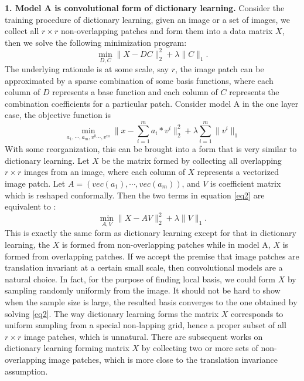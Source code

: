 \documentclass[a4paper]{article}
\begin{document}
{\textbf{1. Model A is convolutional form of dictionary learning.} Consider the training procedure of dictionary learning, given an image or a set of images, we collect all $r\times r$ non-overlapping patches and form them into a data matrix $X$, then we solve the following minimization program:
\begin{equation}
	\min_{D,C} \|X-DC\|_2^2 + \lambda\|C\|_1.
\end{equation}
The underlying rationale is at some scale, say $r$, the image patch can be approximated by a sparse combination of some basis functions, where each column of $D$ represents a base function and each column of $C$ represents the combination coefficients for a particular patch.
Consider model A in the one layer case, the objective function is 
\begin{equation}
\label{eq2}
	\min_{a_1,\cdots,a_m,v^{0}\cdots ,v^{m}} \|x-\sum_{i=1}^{m} a_i*v^{i}\|_2^2 +\lambda \sum_{i=1}^{m} \|v^{i}\|_1
\end{equation}
With some reorganization, this can be brought into a form that is very similar to dictionary learning. Let $X$ be the matrix formed by collecting all overlapping $r\times r$ images from an image, where each column of $X$ represents a vectorized image patch. Let $A=(vec(a_1),\cdots, vec(a_m))$, and $V$ is coefficient matrix which is reshaped conformally. Then the two terms in equation \eqref{eq2} are equivalent to :
\begin{equation}
	\min_{A,V} \|X-AV\|_2^2+\lambda \|V\|_1.
\end{equation}
This is exactly the same form as dictionary learning except for that in dictionary learning, the $X$ is formed from non-overlapping patches while in model A, $X$ is formed from overlapping patches. If we accept the premise that image patches are translation invariant at a certain small scale, then convolutional models are a natural choice. In fact, for the purpose of finding local basis, we could form $X$ by sampling randomly uniformly from the image. It should not be hard to show when the sample size is large, the resulted basis converges to the one obtained by solving \eqref{eq2}. The way dictionary learning forms the matrix $X$ corresponds to uniform sampling from a special non-lapping grid, hence a proper subset of all $r\times r$ image patches, which is unnatural. There are subsequent works on dictionary learning forming matrix $X$ by collecting two or more sets of non-overlapping image patches, which is more close to the translation invariance assumption.

}
\end{document}
